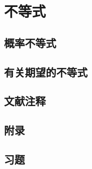 \chapter{不等式}

\section{概率不等式}

\pending

\section{有关期望的不等式}

\pending

\section{文献注释}

\pending

\section{附录}

\pending

\section{习题}

\pending
